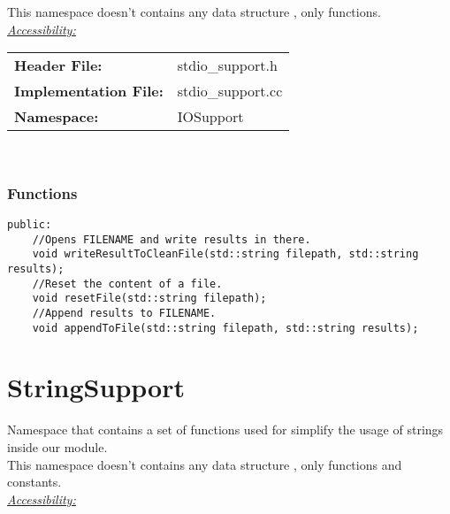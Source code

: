 \documentclass{article}
\newcommand{\sectionbreak}{\clearpage}
\begin{document}
 This namespace doesn't contains any data structure , only functions.\\
 
 \underline{\textit{\underline{Accessibility: }}}\\
 
 \begin{tabular}{ll}
 	\textbf{Header File:} & stdio\_support.h\\
 	\textbf{Implementation File:} & stdio\_support.cc\\
 	\textbf{Namespace: } & IOSupport\\
 \end{tabular}\\

\subsubsection{Functions}

\begin{mdframed}[hidealllines=true, backgroundcolor=magenta!10]
	\begin{lstlisting}[basicstyle=\tiny]
public:
	//Opens FILENAME and write results in there.
	void writeResultToCleanFile(std::string filepath, std::string results);
	//Reset the content of a file.
	void resetFile(std::string filepath);
	//Append results to FILENAME.
	void appendToFile(std::string filepath, std::string results);
	\end{lstlisting}
\end{mdframed}

\sectionbreak{\clearpage}


\section{StringSupport}

Namespace that contains a set of functions used for simplify the usage of strings inside our module.\\

This namespace doesn't contains any data structure , only functions and constants.\\

\underline{\textit{\underline{Accessibility: }}}\\
\end{document}
